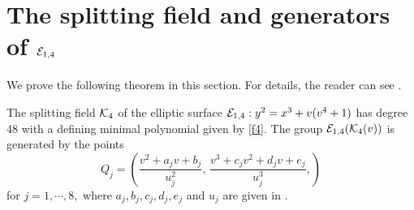 \documentclass[11pt]{amsart}
\begin{document}
\section{The splitting field and generators of ${\mathcal E}_{1, 4}$ }
\label{E8-(1,4)}

We prove the following theorem  in this section. For details, the reader can see  \cite[Check-4]{Shioda360-Codes}.
\begin{thm}
	\label{main3}
	The splitting field ${\mathcal K}_4$ of the elliptic  surface  ${\mathcal E}_{1, 4}: y^2=x^3+   v (v^4+1)$ has degree 48  with a defining minimal polynomial given by \ref{f4}.
	The group  ${\mathcal E}_{1, 4}({\mathcal K}_4(v))$ is generated by the points
	$$Q_j=\left( \frac{ v^2 + a_j v +b_j}{u_j^2}, \, \frac{ v^3 +c_j v^2 + d_j v +e_j}{u_j^3},\right) $$ 
	for $j=1,\cdots, 8,$ 	where 
	$a_j, b_j, c_j, d_j, e_j$  and $u_j$ are given in
	\cite[Points-4]{Shioda360-Codes}.

\end{thm}
\end{document}
